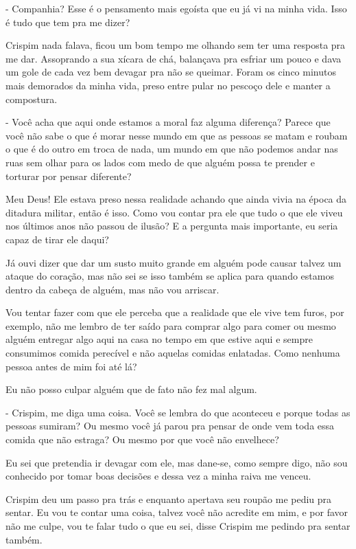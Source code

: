 - Companhia? Esse é o pensamento mais egoísta que eu já vi na minha vida. Isso é tudo que tem pra me dizer?

Crispim nada falava, ficou um bom tempo me olhando sem ter uma resposta pra me dar. Assoprando a sua xícara de chá, balançava pra esfriar um pouco e dava um gole de cada vez bem devagar pra não se queimar. Foram os cinco minutos mais demorados da minha vida, preso entre pular no pescoço dele e manter a compostura.

- Você acha que aqui onde estamos a moral faz alguma diferença? Parece que você não sabe o que é morar nesse mundo em que as pessoas se matam e roubam o que é do outro em troca de nada, um mundo em que não podemos andar nas ruas sem olhar para os lados com medo de que alguém possa te prender e torturar por pensar diferente?

Meu Deus! Ele estava preso nessa realidade achando que ainda vivia na época da ditadura militar, então é isso. Como vou contar pra ele que tudo o que ele viveu nos últimos anos não passou de ilusão? E a pergunta mais importante, eu seria capaz de tirar ele daqui?

Já ouvi dizer que dar um susto muito grande em alguém pode causar talvez um ataque do coração, mas não sei se isso também se aplica para quando estamos dentro da cabeça de alguém, mas não vou arriscar.

Vou tentar fazer com que ele perceba que a realidade que ele vive tem furos, por exemplo, não me lembro de ter saído para comprar algo para comer ou mesmo alguém entregar algo aqui na casa no tempo em que estive aqui e sempre consumimos comida perecível e não aquelas comidas enlatadas. Como nenhuma pessoa antes de mim foi até lá?

Eu não posso culpar alguém que de fato não fez mal algum.

- Crispim, me diga uma coisa. Você se lembra do que aconteceu e porque todas as pessoas sumiram? Ou mesmo você já parou pra pensar de onde vem toda essa comida que não estraga? Ou mesmo por que você não envelhece?

Eu sei que pretendia ir devagar com ele, mas dane-se, como sempre digo, não sou conhecido por tomar boas decisões e dessa vez a minha raiva me venceu.

Crispim deu um passo pra trás e enquanto apertava seu roupão me pediu pra sentar. Eu vou te contar uma coisa, talvez você não acredite em mim, e por favor não me culpe, vou te falar tudo o que eu sei, disse Crispim me pedindo pra sentar também.

